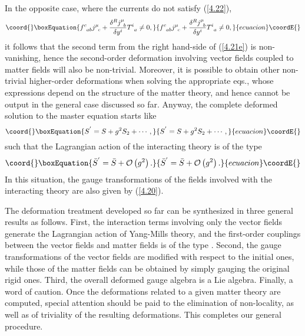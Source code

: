 \documentclass[a4paper,12pt]{article}
\begin{document}
In the opposite case, where the currents do
not satisfy (\ref{4.22}),
\begin{equation}\coord{}\boxEquation{
f_{\;\;ab}^{c}j_{\;\;c}^{\mu }+
\frac{\delta ^{R}j_{\;\;b}^{\mu }}{\delta
y^{i}}T_{\;\;a}^{i}\neq 0,  \label{4.25}
}{
f_{\;\;ab}^{c}j_{\;\;c}^{\mu }+
\frac{\delta ^{R}j_{\;\;b}^{\mu }}{\delta
y^{i}}T_{\;\;a}^{i}\neq 0,  }{ecuacion}\coordE{}\end{equation}
it follows that the second term from the
right hand-side of (\ref{4.21e}) is
non-vanishing, hence the second-order
deformation involving vector fields
coupled to matter fields will also be
non-trivial. Moreover, it is possible
to obtain other non-trivial higher-order
deformations when solving the
appropriate eqs., whose expressions
depend on the structure of the matter
theory, and hence cannot be output in
the general case discussed so far.
Anyway, the complete deformed solution
to the master equation starts like
\begin{equation}\coord{}\boxEquation{
S^{^{\prime }}=S+g^{2}S_{2}+\cdots ,  \label{4.26}
}{
S^{^{\prime }}=S+g^{2}S_{2}+\cdots ,  }{ecuacion}\coordE{}\end{equation}
such that the Lagrangian action of the
interacting theory is of the type
\begin{equation}\coord{}\boxEquation{
\bar{S}^{^{\prime }}=\bar{S}+
{\mathcal{O}}\left( g^{2}\right) .  \label{4.27}
}{
\bar{S}^{^{\prime }}=\bar{S}+
{\mathcal{O}}\left( g^{2}\right) .  }{ecuacion}\coordE{}\end{equation}
In this situation, the gauge
transformations of the fields involved with the
interacting theory are also given by
(\ref{4.20}).

The deformation treatment developed so
far can be synthesized in three
general results as follows. First, the
interaction terms involving only the
vector fields generate the Lagrangian
action of Yang-Mills theory, and the
first-order couplings between the vector
fields and matter fields is of the
type \coordHE{}.
Second, the gauge transformations of
the vector fields are modified with
respect to the initial ones, while those
of the matter fields can be obtained by
simply gauging the original rigid
ones. Third, the overall deformed gauge
algebra is a Lie algebra. Finally, a
word of caution. Once the deformations
related to a given matter theory are
computed, special attention should be
paid to the elimination of
non-locality, as well as of triviality
of the resulting deformations. This
completes our general procedure.
\end{document}
